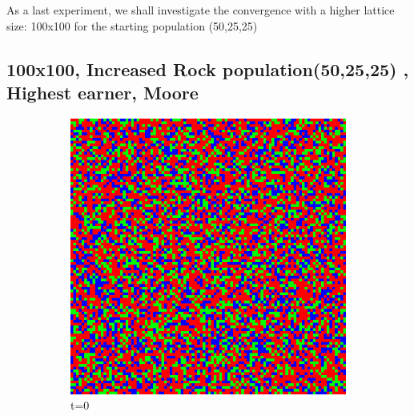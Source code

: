 \documentclass[a4paper, 11pt]{article}
\begin{document}
As a last experiment, we shall investigate the convergence with a higher lattice size: 100x100 for the starting population (50,25,25)


\newpage
\begin{landscape}
\subsection{100x100, Increased Rock population(50,25,25) , Highest earner, Moore}

\begin{figure}[H]
\centering
\begin{subfigure}{.20\textwidth}
  \centering
  \includegraphics[width=0.95\linewidth]{ROCK_PAPER_SCISSORS_MOORE_100x100_HighRockPop50_t00}
  \caption{t=0}
\end{subfigure}%
\begin{subfigure}{.20\textwidth}
  \centering

\end{subfigure}
\end{figure}
\end{landscape}
\end{document}

